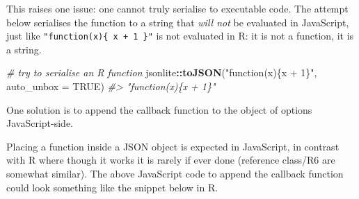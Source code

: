 \documentclass[10pt,]{krantz}
\makeatletter
\newenvironment{Shaded}{\begin{snugshade}}{\end{snugshade}}
\newcommand{\CommentTok}[1]{\textcolor[rgb]{0.37,0.37,0.37}{\textit{#1}}}
\newcommand{\ControlFlowTok}[1]{\textcolor[rgb]{0.27,0.27,0.27}{\textbf{#1}}}
\newcommand{\DataTypeTok}[1]{\textcolor[rgb]{0.27,0.27,0.27}{#1}}
\newcommand{\KeywordTok}[1]{\textcolor[rgb]{0.27,0.27,0.27}{\textbf{#1}}}
\newcommand{\NormalTok}[1]{#1}
\newcommand{\OperatorTok}[1]{\textcolor[rgb]{0.43,0.43,0.43}{\textbf{#1}}}
\newcommand{\OtherTok}[1]{\textcolor[rgb]{0.37,0.37,0.37}{#1}}
\newcommand{\StringTok}[1]{\textcolor[rgb]{0.5,0.5,0.5}{#1}}
\newenvironment{kframe}{%
\medskip{}
\setlength{\fboxsep}{.8em}
 \def\at@end@of@kframe{}%
 \ifinner\ifhmode%
  \def\at@end@of@kframe{\end{minipage}}%
  \begin{minipage}{\columnwidth}%
 \fi\fi%
 \def\FrameCommand##1{\hskip\@totalleftmargin \hskip-\fboxsep
 \colorbox{shadecolor}{##1}\hskip-\fboxsep
     \hskip-\linewidth \hskip-\@totalleftmargin \hskip\columnwidth}%
 \MakeFramed {\advance\hsize-\width
   \@totalleftmargin\z@ \linewidth\hsize
   \@setminipage}}%
 {\par\unskip\endMakeFramed%
 \at@end@of@kframe}
\renewenvironment{Shaded}{\begin{kframe}}{\end{kframe}}
\makeatother
\begin{document}
This raises one issue: one cannot truly serialise to executable code. The attempt below serialises the function to a string that \emph{will not} be evaluated in JavaScript, just like \texttt{"function(x)\{\ x\ +\ 1\ \}"} is not evaluated in R: it is not a function, it is a string.

\begin{Shaded}
\begin{Highlighting}[]
\CommentTok{# try to serialise an R function}
\NormalTok{jsonlite}\OperatorTok{::}\KeywordTok{toJSON}\NormalTok{(}\StringTok{"function(x)\{x + 1\}"}\NormalTok{, }\DataTypeTok{auto_unbox =} \OtherTok{TRUE}\NormalTok{)}
\CommentTok{#> "function(x)\{x + 1\}"}
\end{Highlighting}
\end{Shaded}

One solution is to append the callback function to the object of options JavaScript-side.

\begin{Shaded}
\end{Shaded}

Placing a function inside a JSON object is expected in JavaScript, in contrast with R where though it works it is rarely if ever done (reference class/R6 are somewhat similar). The above JavaScript code to append the callback function could look something like the snippet below in R.

\begin{Shaded}
\end{Shaded}
\end{document}
